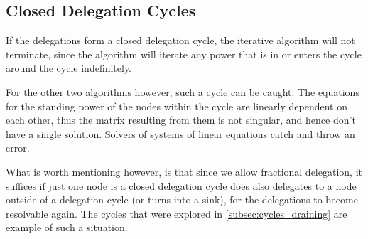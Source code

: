 \subsection{Closed Delegation Cycles}

If the delegations form a closed delegation cycle, the iterative algorithm will not terminate, since the algorithm will iterate any power that is in or enters the cycle around the cycle indefinitely. 

For the other two algorithms however, such a cycle can be caught. The equations for the standing power of the nodes within the cycle are linearly dependent on each other, thus the matrix resulting from them is not singular, and hence don't have a single solution. Solvers of systems of linear equations catch and throw an error.

What is worth mentioning however, is that since we allow fractional delegation, it suffices if just one node is a closed delegation cycle does also delegates to a node outside of a delegation cycle (or turns into a sink), for the delegations to become resolvable again. The cycles that were explored in \cref{subsec:cycles_draining} are example of such a situation. 


